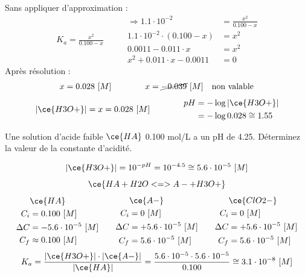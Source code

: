 \documentclass[
  11pt,
  a4paper,
  openany]{book}
\begin{document}
\begin{Answer}
Sans appliquer d'approximation :
\[
\begin{split}
K_a = \frac{x^2}{0.100-x}
\end{split}
\qquad
\begin{split}
\Rightarrow 1.1 \cdot 10^{-2} &= \frac{x^2}{0.100-x} \\
1.1 \cdot 10^{-2} \cdot (0.100-x) &= x^2 \\
0.0011 - 0.011 \cdot x &= x^2 \\
x^2 + 0.011 \cdot x - 0.0011 &= 0
\end{split}
\]
Après résolution :
\[
\begin{split}
x = 0.028\ [M]
\end{split}
\qquad\qquad
\begin{split}
x = \cancel{-0.039}\ [M] \quad \text{non valable}
\end{split}
\]
\[
\begin{split}
|\ce{H3O+}| = x = 0.028\ [M]
\end{split}
\qquad\qquad
\begin{split}
pH &= - \log |\ce{H3O+}| \\
 &= - \log 0.028 \cong 1.55
\end{split}
\]

\end{Answer}

\begin{Exercise}
Une solution d'acide faible \(\ce{HA}\) 0.100 mol/L a un pH de 4.25. Déterminez la valeur de la constante d'acidité.

\end{Exercise}

\begin{Answer}
\[
|\ce{H3O+}| = 10^{-pH} = 10^{-4.5} \cong 5.6 \cdot 10^{-5}\ [M]
\]
\[
\ce{HA + H2O <=> A- + H3O+}
\]
\[
\begin{split}
&\ce{HA}\\
C_i &= 0.100\ [M] \\
\Delta C &= - 5.6 \cdot 10^{-5}\ [M] \\
C_f &\approx 0.100\ [M] \\
\end{split}
\qquad
\begin{split}
&\ce{A-}\\
C_i &= 0\ [M] \\
\Delta C &= + 5.6 \cdot 10^{-5}\ [M] \\
C_f &= 5.6 \cdot 10^{-5}\ [M] \\
\end{split}
\qquad
\begin{split}
&\ce{ClO2-}\\
C_i &= 0\ [M] \\
\Delta C &= + 5.6 \cdot 10^{-5}\ [M] \\
C_f &= 5.6 \cdot 10^{-5}\ [M] \\
\end{split}
\]
\[
K_a = \frac{|\ce{H3O+}| \cdot |\ce{A-}|}{|\ce{HA}|} = \frac{5.6 \cdot 10^{-5} \cdot 5.6 \cdot 10^{-5}}{0.100} \cong 3.1 \cdot 10^{-8}\ [M]
\]

\end{Answer}
\end{document}
